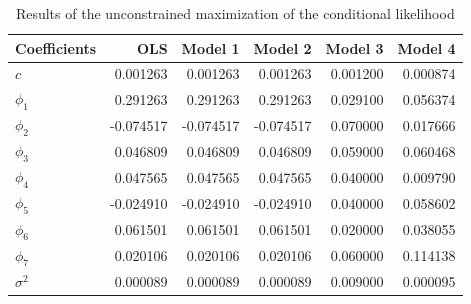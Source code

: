 \documentclass{article}
\begin{document}
\begin{table}[h]
\centering
\caption{Results of the unconstrained maximization of the conditional likelihood}
\begin{tabular}{lrrrrr}
\toprule
Coefficients & OLS & Model 1 & Model 2 & Model 3 & Model 4 \\
\midrule
$c$ & 0.001263 & 0.001263 & 0.001263 & 0.001200 & 0.000874 \\
$\phi_1$ & 0.291263 & 0.291263 & 0.291263 & 0.029100 & 0.056374 \\
$\phi_2$ & -0.074517 & -0.074517 & -0.074517 & 0.070000 & 0.017666 \\
$\phi_3$ & 0.046809 & 0.046809 & 0.046809 & 0.059000 & 0.060468 \\
$\phi_4$ & 0.047565 & 0.047565 & 0.047565 & 0.040000 & 0.009790 \\
$\phi_5$ & -0.024910 & -0.024910 & -0.024910 & 0.040000 & 0.058602 \\
$\phi_6$ & 0.061501 & 0.061501 & 0.061501 & 0.020000 & 0.038055 \\
$\phi_7$ & 0.020106 & 0.020106 & 0.020106 & 0.060000 & 0.114138 \\
$\sigma^2$ & 0.000089 & 0.000089 & 0.000089 & 0.009000 & 0.000095 \\
\bottomrule
\end{tabular}
\end{table}
\end{document}
